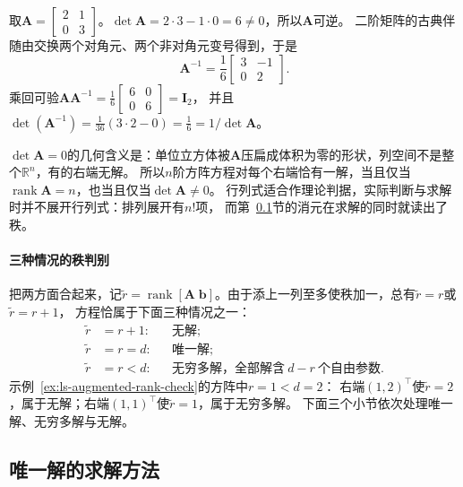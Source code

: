 \begin{example}[用伴随矩阵求二阶逆]
\label{ex:ls-adjugate-two-by-two}
取$\bm A=\left[\begin{smallmatrix}2&1\\0&3\end{smallmatrix}\right]$。$\det\bm A=2\cdot3-1\cdot0=6\neq0$，所以$\bm A$可逆。
二阶矩阵的古典伴随由交换两个对角元、两个非对角元变号得到，于是
\[
 \bm A^{-1}=\frac16\begin{bmatrix}3&-1\\0&2\end{bmatrix}.
\]
乘回可验$\bm A\bm A^{-1}=\frac16\left[\begin{smallmatrix}6&0\\0&6\end{smallmatrix}\right]=\bm I_2$，
并且$\det(\bm A^{-1})=\frac1{36}(3\cdot2-0)=\frac16=1/\det\bm A$。
\end{example}

$\det\bm A=0$的几何含义是：单位立方体被$\bm A$压扁成体积为零的形状，列空间不是整个$\mathbb R^n$，有的右端无解。
所以$n$阶方阵方程对每个右端恰有一解，当且仅当$\operatorname{rank}\bm A=n$，也当且仅当$\det\bm A\neq0$。
行列式适合作理论判据，实际判断与求解时并不展开行列式：排列展开有$n!$项，
而第~\ref{sec:ls-direct-methods}节的消元在求解的同时就读出了秩。

\paragraph{三种情况的秩判别}

把两方面合起来，记$\tilde r=\operatorname{rank}[\bm A\;\bm b]$。由于添上一列至多使秩加一，总有$\tilde r=r$或$\tilde r=r+1$，
方程恰属于下面三种情况之一：
\[
 \begin{aligned}
  \tilde r&=r+1: &&\text{无解};\\
  \tilde r&=r=d: &&\text{唯一解};\\
  \tilde r&=r<d: &&\text{无穷多解，全部解含}\ d-r\ \text{个自由参数}.
 \end{aligned}
\]
示例~\ref{ex:ls-augmented-rank-check}的方阵中$r=1<d=2$：
右端$(1,2)^\top$使$\tilde r=2$，属于无解；右端$(1,1)^\top$使$\tilde r=1$，属于无穷多解。
下面三个小节依次处理唯一解、无穷多解与无解。

\subsection{唯一解的求解方法}
\label{sec:ls-direct-methods}
\label{sec:linear-algebra-direct-exact}
\label{sec:matrix-analysis-stable-solvers}

